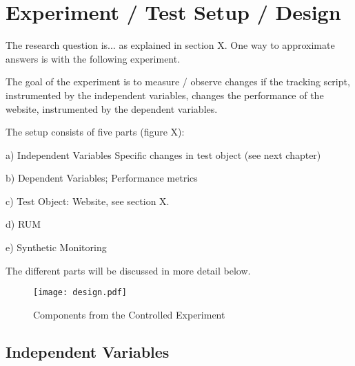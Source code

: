 





\section{Experiment / Test Setup / Design}


The research question is... as explained in section X.
One way to approximate answers is with the following experiment.



The goal of the experiment is to measure / observe changes if the tracking script, instrumented by the independent variables, changes the performance of the website, instrumented by the dependent variables.

The setup consists of five parts (figure X):

a) Independent Variables Specific changes in test object (see next chapter)

b) Dependent Variables; Performance metrics

c) Test Object: Website, see section X.

d) RUM

e) Synthetic Monitoring

The different parts will be discussed in more detail below.

\begin{figure}[h!]
\begin{center}
\texttt{[image: design.pdf]}
\caption{Components from the Controlled Experiment}
\label{figure:design_setup}
\end{center}
\end{figure}






\subsection{Independent Variables}

